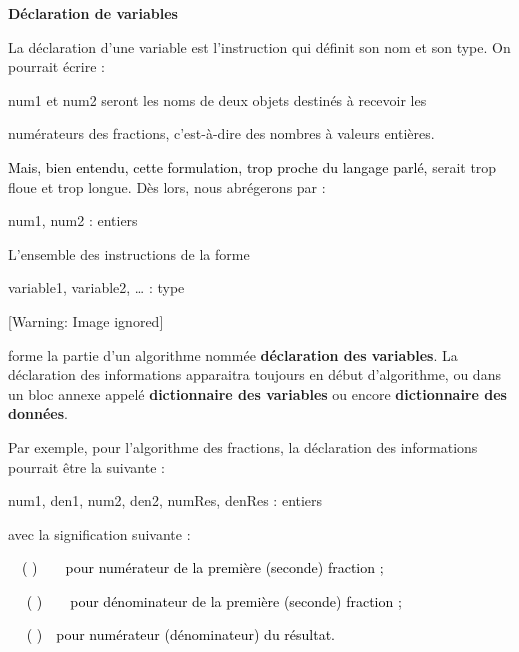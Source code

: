 {\sffamily\bfseries\upshape
Déclaration de variables}

{
La déclaration d’une variable est l’instruction qui définit son nom et
son type. On pourrait écrire :}

{\sffamily
num1 et num2 seront les noms de deux objets destinés à recevoir les}

{\sffamily
numérateurs des fractions, c’est-à-dire des nombres à valeurs entières.}

{
\textcolor{black}{Mais, bien entendu, cette formulation, trop proche du
langage parlé, }serait trop floue et trop longue. Dès lors, nous
abrégerons par :}

{\sffamily
num1, num2 : entiers}

{
L’ensemble des instructions de la forme}

{\sffamily
variable1, variable2, … : type}

\begin{center}
 [Warning: Image ignored] %

\end{center}
{
forme la partie d’un algorithme nommée \textbf{déclaration des
variables}. La déclaration des informations apparaitra toujours en
début d’algorithme, ou dans un bloc annexe appelé \textbf{dictionnaire
des variables} ou encore \textbf{dictionnaire des données}.}

{
Par exemple, pour l’algorithme des fractions, la déclaration des
informations pourrait être la suivante :}

{\sffamily
num1, den1, num2, den2, numRes, denRes : entiers}

{
avec la signification suivante :}

{
\ \ \textstyleCodeInsr{\textcolor{black}{num1 }}\textcolor{black}{(
}\textstyleCodeInsr{\textcolor{black}{num2}}\textcolor{black}{
)}\textcolor{black}{\ \ \ \ pour numérateur de la première (seconde)
fraction ;}}

{
\textcolor{black}{\ \ }\textstyleCodeInsr{\textcolor{black}{den1}}\textcolor{black}{
( }\textstyleCodeInsr{\textcolor{black}{den2}}\textcolor{black}{
)}\textcolor{black}{\ \ \ \ pour dénominateur de la première (seconde)
fraction ;}}

{
\textcolor{black}{\ \ }\textstyleCodeInsr{\textcolor{black}{numRes}}\textcolor{black}{
( }\textstyleCodeInsr{\textcolor{black}{denRes
}}\textcolor{black}{)}\textcolor{black}{\ \ pour numérateur
(dénominateur) du résultat.}}

